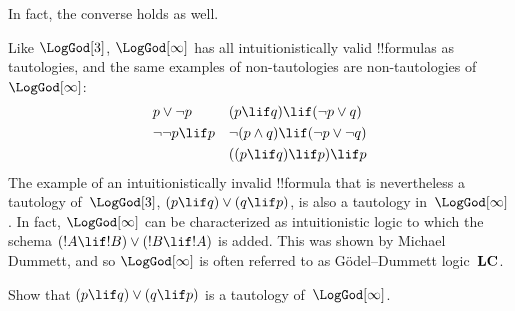\documentclass[../../../include/open-logic-section]{subfiles}
\begin{document}
In fact, the converse holds as well.

Like $\LogGod[3]$, $\LogGod[\infty]$ has all intuitionistically valid
!!{formula}s as tautologies, and the same examples of non-tautologies
are non-tautologies of~$\LogGod[\infty]$:
\begin{align*}
  & p \lor \lnot p && (p \lif q) \lif (\lnot p \lor q) \\
  & \lnot\lnot p \lif p && \lnot(p \land q) \lif (\lnot p \lor \lnot q) \\
  &&& ((p \lif q) \lif p) \lif p
\end{align*}
The example of an intuitionistically invalid !!{formula} that is
nevertheless a tautology of~$\LogGod[3]$, $(p \lif q) \lor (q \lif
p)$, is also a tautology in~$\LogGod[\infty]$. In fact,
$\LogGod[\infty]$ can be characterized as intuitionistic logic to
which the schema $(!A \lif !B) \lor (!B \lif !A)$ is added. This was
shown by Michael Dummett, and so $\LogGod[\infty]$ is often referred to
as G\"odel--Dummett logic~$\Log{LC}$.

\begin{prob}
  Show that $(p \lif q) \lor (q \lif p)$ is a
  tautology of~$\LogGod[\infty]$.
\end{prob}
\end{document}
